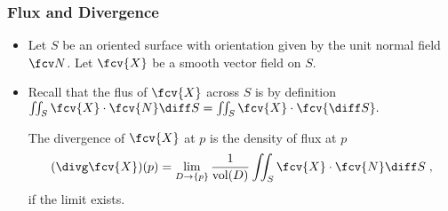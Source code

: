 

\begin{frame}
\frametitle{Flux and Divergence}
\begin{itemize}
\item Let $S$ be an oriented surface with orientation given by the unit normal field $\fcv N$. Let $\fcv{X}$ be a smooth vector field on $S$.
\item Recall that the flus of $\fcv{X}$ across $S$ is by definition
$\iint_S \fcv{X}\cdot \fcv{N} \diff S = \iint_S \fcv{X} \cdot \fcv{\diff S} .$
\begin{theorem}
The divergence of $\fcv{X}$ at $p$ is the density of flux at $p$
\[
(\divg \fcv{X})(p) = \lim_{D\to \{p\}} \frac{1}{\text{vol}(D)} \iint_S \fcv{X} \cdot \fcv{N}\diff S \; ,
\]
if the limit exists.
\end{theorem}
\end{itemize}
\end{frame}